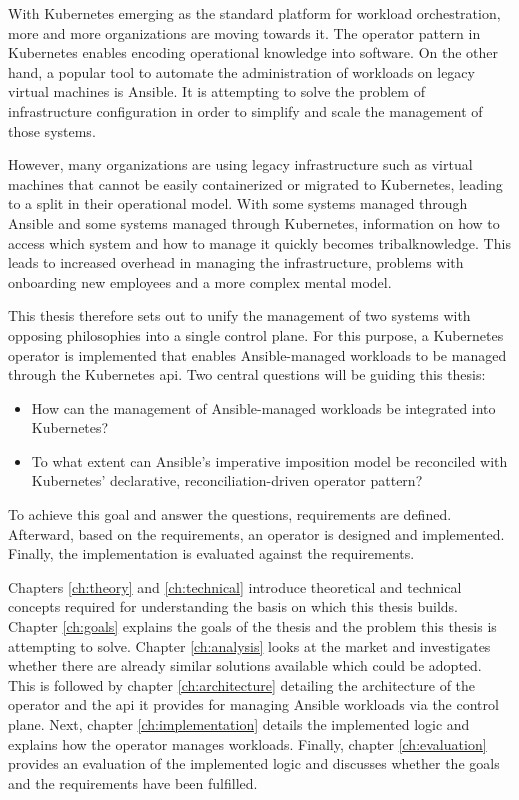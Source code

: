 With Kubernetes emerging as the standard platform for workload orchestration, more and more organizations are moving towards it.
The operator pattern in Kubernetes enables encoding operational knowledge into software.
On the other hand, a popular tool to automate the administration of workloads on legacy virtual machines is Ansible.
It is attempting to solve the problem of infrastructure configuration in order to simplify and scale the management of those systems.
\parencite{poulton2025kubernetes, k8soperators, ansibledocsindex}

However, many organizations are using legacy infrastructure such as virtual machines that cannot be easily containerized or migrated to Kubernetes, leading to a split in their operational model.
With some systems managed through Ansible and some systems managed through Kubernetes, information on how to access which system and how to manage it quickly becomes \gls{tribalknowledge}.
This leads to increased overhead in managing the infrastructure, problems with onboarding new employees and a more complex mental model.
\parencite{platformengineering-architects}

This thesis therefore sets out to unify the management of two systems with opposing philosophies into a single control plane.
For this purpose, a Kubernetes operator is implemented that enables Ansible-managed workloads to be managed through the Kubernetes \gls{api}.
Two central questions will be guiding this thesis:

\begin{itemize}
    \item How can the management of Ansible-managed workloads be integrated into
    Kubernetes?
    \item To what extent can Ansible's imperative imposition model be
    reconciled with Kubernetes' declarative, reconciliation-driven operator
    pattern?
\end{itemize}

To achieve this goal and answer the questions, requirements are defined.
Afterward, based on the requirements, an operator is designed and implemented.
Finally, the implementation is evaluated against the requirements.

Chapters \ref{ch:theory} and \ref{ch:technical} introduce theoretical and technical concepts required for understanding the basis on which this thesis builds.
Chapter \ref{ch:goals} explains the goals of the thesis and the problem this thesis is attempting to solve.
Chapter \ref{ch:analysis} looks at the market and investigates whether there are already similar solutions available which could be adopted.
This is followed by chapter \ref{ch:architecture} detailing the architecture of the operator and the \gls{api} it provides for managing Ansible workloads via the control plane.
Next, chapter \ref{ch:implementation} details the implemented logic and explains how the operator manages workloads.
Finally, chapter \ref{ch:evaluation} provides an evaluation of the implemented logic and discusses whether the goals and the requirements have been fulfilled.
